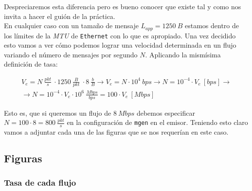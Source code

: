\documentclass[11pt]{article}
\begin{document}
        Despreciaremos esta diferencia pero es bueno conocer que existe tal y como nos invita a hacer el guión de la práctica.\\

        En cualquier caso con un tamaño de mensaje $L_{app} = 1250\ B$ estamos dentro de los límites de la \textit{MTU} de \texttt{Ethernet} con lo que es apropiado. Una vez decidido esto vamos a ver cómo podemos lograr una velocidad determinada en un flujo variando el número de mensajes por segundo $N$. Aplicando la mismísima definición de tasa:

        \begin{multline*}
            V_e = N\ \frac{pkt}{s}\ \cdot 1250\ \frac{B}{pkt}\ \cdot 8\ \frac{b}{B} \rightarrow V_e = N \cdot 10^4\ bps \rightarrow N = 10^{-4} \cdot V_e\ [bps] \rightarrow\\
            \rightarrow N = 10^{-4} \cdot V_e \cdot 10^6\ \frac{Mbps}{bps} = 100 \cdot V_e\ [Mbps]
        \end{multline*}

        Esto es, que si queremos un flujo de $8\ Mbps$ debemos especificar $N = 100 \cdot 8 = 800\ \frac{pkt}{s}$ en la configuración de \texttt{mgen} en el emisor. Teniendo esto claro vamos a adjuntar cada una de las figuras que se nos requerían en este caso.

        \subsection{Figuras}
            \subsubsection{Tasa de cada flujo}
                
\end{document}
